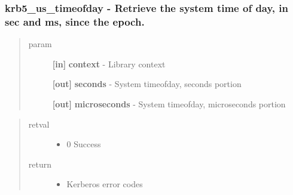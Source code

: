 \documentclass[letterpaper,10pt,english]{sphinxmanual}
\begin{document}
\subsubsection{krb5\_us\_timeofday -  Retrieve the system time of day, in sec and ms, since the epoch.}
\label{appdev/refs/api/krb5_us_timeofday:krb5-us-timeofday-retrieve-the-system-time-of-day-in-sec-and-ms-since-the-epoch}\label{appdev/refs/api/krb5_us_timeofday::doc}

\begin{fulllineitems}
\label{appdev/refs/api/krb5_us_timeofday:krb5_us_timeofday}
\end{fulllineitems}

\begin{quote}\begin{description}
\item[{param}] \leavevmode
\textbf{{[}in{]}} \textbf{context} - Library context

\textbf{{[}out{]}} \textbf{seconds} - System timeofday, seconds portion

\textbf{{[}out{]}} \textbf{microseconds} - System timeofday, microseconds portion

\end{description}\end{quote}
\begin{quote}\begin{description}
\item[{retval}] \leavevmode\begin{itemize}
\item {} 
0   Success

\end{itemize}

\item[{return}] \leavevmode\begin{itemize}
\item {} 
Kerberos error codes

\end{itemize}

\end{description}\end{quote}
\end{document}

